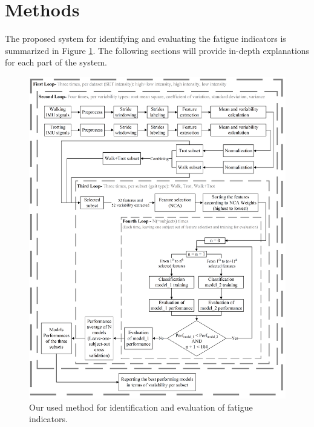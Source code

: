 \section{Methods}
\label{sec:methods}

The proposed system for identifying and evaluating the fatigue indicators is summarized in Figure \ref{prepost_system}. The following sections will provide in-depth explanations for each part of the system. %

\begin{figure}[htbp]
\centering
\includegraphics[width=.95\linewidth]{chapters/prepost/figures/Untitled_HQ.png}
\caption{Our used method for identification and evaluation of fatigue indicators.}
\label{prepost_system}
\end{figure}

